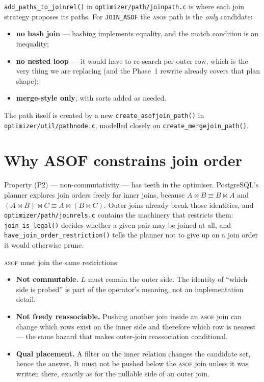 \documentclass[11pt,a4paper]{report}
\theoremstyle{definition}
\theoremstyle{plain}
\newcommand{\code}[1]{\texttt{\small #1}}
\newcommand{\file}[1]{\texttt{\footnotesize #1}}
\newcommand{\asof}{{\normalfont\scshape asof}}
\begin{document}
\code{add\_paths\_to\_joinrel()} in \file{optimizer/path/joinpath.c} is where each join
strategy proposes its paths. For \code{JOIN\_ASOF} the \asof{} path is the \emph{only}
candidate:

\begin{itemize}[nosep]
\item \textbf{no hash join} --- hashing implements equality, and the match condition is an
      inequality;
\item \textbf{no nested loop} --- it would have to re-search per outer row, which is the
      very thing we are replacing (and the Phase~1 rewrite already covers that plan shape);
\item \textbf{merge-style only}, with sorts added as needed.
\end{itemize}

The path itself is created by a new \code{create\_asofjoin\_path()} in
\file{optimizer/util/pathnode.c}, modelled closely on \code{create\_mergejoin\_path()}.

\section{Why ASOF constrains join order}

Property (P2) --- non-commutativity --- has teeth in the optimiser. PostgreSQL's planner
explores join orders freely for inner joins, because
$A \bowtie B \equiv B \bowtie A$ and
$(A \bowtie B) \bowtie C \equiv A \bowtie (B \bowtie C)$. Outer joins already break those
identities, and \file{optimizer/path/joinrels.c} contains the machinery that restricts
them: \code{join\_is\_legal()} decides whether a given pair may be joined at all, and
\code{have\_join\_order\_restriction()} tells the planner not to give up on a join order it
would otherwise prune.

\asof{} must join the same restrictions:

\begin{itemize}[nosep]
\item \textbf{Not commutable.} $L$ must remain the outer side. The identity of ``which side
      is probed'' is part of the operator's meaning, not an implementation detail.
\item \textbf{Not freely reassociable.} Pushing another join inside an \asof{} join can
      change which rows exist on the inner side and therefore which row is nearest ---
      the same hazard that makes outer-join reassociation conditional.
\item \textbf{Qual placement.} A filter on the inner relation changes the candidate set,
      hence the answer. It must not be pushed below the \asof{} join unless it was written
      there, exactly as for the nullable side of an outer join.
\end{itemize}
\end{document}
